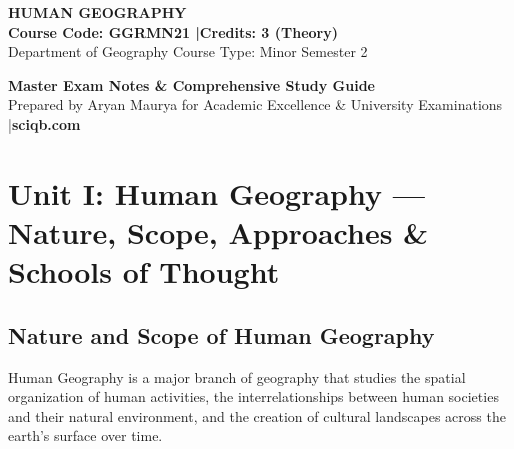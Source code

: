 \documentclass[11pt,a4paper]{article}
\begin{document}
\begin{center}
  \begin{tcolorbox}[width=\textwidth,coltext=white,halign=center]
    \vspace{4pt}
    {\Huge \bfseries HUMAN GEOGRAPHY}\\[6pt]
    {\Large \bfseries Course Code: GGRMN21 \quad|\quad Credits: 3 (Theory)}\\[4pt]
    {\small Department of Geography \quad\textbullet\quad Course Type: Minor \quad\textbullet\quad Semester 2}
    \vspace{4pt}
  \end{tcolorbox}
  \vspace{6pt}
  {\Large \bfseries Master Exam Notes \& Comprehensive Study Guide}\\[2pt]
  {\small Prepared by Aryan Maurya for Academic Excellence \& University Examinations \quad|\quad \textbf{sciqb.com}}
\end{center}

\vspace{8pt}
\tableofcontents
\newpage

\section{Unit I: Human Geography --- Nature, Scope, Approaches \& Schools of Thought}

\subsection{Nature and Scope of Human Geography}

\begin{defbox}
Human Geography is a major branch of geography that studies the spatial organization of human activities, the interrelationships between human societies and their natural environment, and the creation of cultural landscapes across the earth's surface over time.
\end{defbox}
\end{document}
